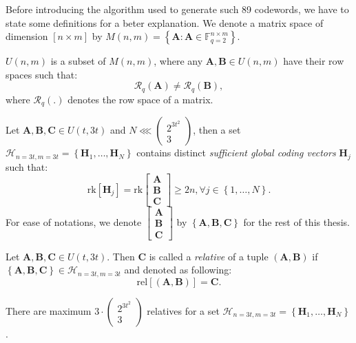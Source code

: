 Before introducing the algorithm used to generate such 89 codewords,
we have to state some definitions for a beter explanation. We denote
a matrix space of dimension $\left[n\times m\right]$ by $M(n,m)=\left\{ \boldsymbol{A}:\boldsymbol{A}\in\ensuremath{\mathbb{F}}_{q=2}^{n\times m}\right\} $.
\begin{defn}
 $U(n,m)$ is a subset of $M(n,m)$, where any $\boldsymbol{A},\boldsymbol{B}\in U(n,m)$
have their row spaces such that:
\[
\mathcal{R}_{q}\left(\boldsymbol{A}\right)\neq\mathcal{R}_{q}\left(\boldsymbol{B}\right),
\]
where $\mathcal{R}_{q}\left(.\right)$ denotes the row space of a
matrix.
\end{defn}
%
\begin{defn}
 Let $\boldsymbol{A},\boldsymbol{B},\boldsymbol{C}\in U(t,3t)$ and
$N\lll\left(\begin{array}{c}
2^{3t^{2}}\\
3
\end{array}\right)$, then a set $\mathcal{H}_{n=3t,m=3t}=\left\{ \boldsymbol{H}_{1},\ldots,\boldsymbol{H}_{N}\right\} $
contains distinct \textit{sufficient global coding vectors} $\boldsymbol{H}_{j}$
such that:
\[
\mathrm{rk}\left[\boldsymbol{H}_{j}\right]=\mathrm{rk}\left[\begin{array}{c}
\boldsymbol{A}\\
\boldsymbol{B}\\
\boldsymbol{C}
\end{array}\right]\geq2n,\forall j\in\left\{ 1,\ldots,N\right\} .
\]
For ease of notations, we denote $\left[\begin{array}{c}
\boldsymbol{A}\\
\boldsymbol{B}\\
\boldsymbol{C}
\end{array}\right]$ by $\left\{ \boldsymbol{A},\boldsymbol{B},\boldsymbol{C}\right\} $
for the rest of this thesis.
\end{defn}
%
\begin{defn}[Relative]
 Let $\boldsymbol{A},\boldsymbol{B},\boldsymbol{C}\in U(t,3t)$.
Then $\boldsymbol{C}$ is called a \textit{relative} of a tuple $\left(\boldsymbol{A},\boldsymbol{B}\right)$
if $\left\{ \boldsymbol{A},\boldsymbol{B},\boldsymbol{C}\right\} \in\mathcal{H}_{n=3t,m=3t}$
and denoted as following:
\[
\mathrm{rel}\left[\left(\boldsymbol{A},\boldsymbol{B}\right)\right]=\boldsymbol{C}.
\]
\end{defn}
\begin{lem}
There are maximum $3\cdot\left(\begin{array}{c}
2^{3t^{2}}\\
3
\end{array}\right)$ relatives for a set $\mathcal{H}_{n=3t,m=3t}=\left\{ \boldsymbol{H}_{1},\ldots,\boldsymbol{H}_{N}\right\} $.
\label{lem:num_of_relatives}
\end{lem}
